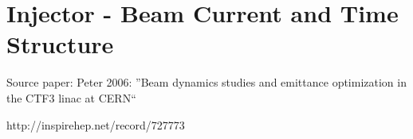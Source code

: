 \section{Injector - Beam Current and Time Structure}



Source paper: 
Peter 2006: ''Beam dynamics studies and emittance optimization in the CTF3 linac at CERN``

http://inspirehep.net/record/727773
